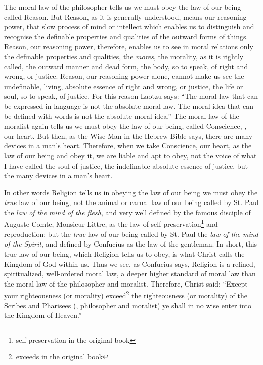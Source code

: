 The moral law of the philosopher tells us we must obey the law of our being called Reason.
But Reason, as it is generally understood, means our reasoning power, that slow process of mind or intellect which enables us to distinguish and recognise the definable properties and qualities of the outward forms of things.
Reason, our reasoning power, therefore, enables us to see in moral relations only the definable properties and qualities, the \emph{mores}, the morality, as it is rightly called, the outward manner and dead form, the body, so to speak, of right and wrong, or justice.
Reason, our reasoning power alone, cannot make us see the undefinable, living, absolute essence of right and wrong, or justice, the life or soul, so to speak, of justice.
For this reason Laotzu says: ``The moral law that can be expressed in language is not the absolute moral law. The moral idea that can be defined with words is not the absolute moral idea.''\cite{num20}
The moral law of the moralist again tells us we must obey the law of our being, called Conscience, \ie, our heart.
But then, as the Wise Man in the Hebrew Bible says, there are many devices in a man's heart.
Therefore, when we take Conscience, our heart, as the law of our being and obey it, we are liable and apt to obey, not the voice of what I have called the soul of justice, the indefinable absolute essence of justice, but the many devices in a man's heart.

In other words Religion tells us in obeying the law of our being we must obey the \emph{true} law of our being, not the animal or carnal law of our being called by St. Paul the \emph{law of the mind of the flesh}, and very well defined by the famous disciple of Auguste Comte, Monsieur Littre, as the law of self-preservation\footnote{self preservation in the original book} and reproduction; but the \emph{true} law of our being called by St. Paul the \emph{law of the mind of the Spirit}, and defined by Confucius as the law of the gentleman.
In short, this true law of our being, which Religion tells us to obey, is what Christ calls the Kingdom of God within us.
Thus we see, as Confucius says, Religion is a refined, spiritualized, well-ordered moral law, a deeper higher standard of moral law than the moral law of the philosopher and moralist.
Therefore, Christ said: ``Except your righteousness (or morality) exceed\footnote{exceeds in the original book} the righteousness (or morality) of the Scribes and Pharisees (\ie, philosopher and moralist) ye shall in no wise enter into the Kingdom of Heaven.''

